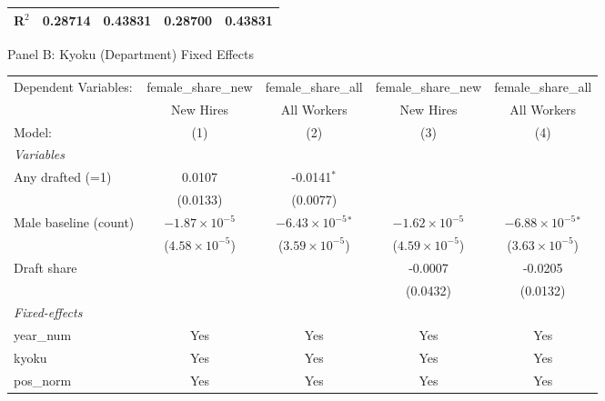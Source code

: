 \begin{table}[htbp]
\begin{threeparttable}
\begin{tabular}{lcccc}
   R$^2$                 & 0.28714                 & 0.43831                 & 0.28700                 & 0.43831\\  
   \midrule \midrule
\end{tabular}
\par\endgroup
\vspace{2ex}
Panel B: Kyoku (Department) Fixed Effects\\[1ex]
\begingroup
\centering
\begin{tabular}{lcccc}
   \tabularnewline \midrule \midrule
   Dependent Variables:  & female\_share\_new      & female\_share\_all           & female\_share\_new      & female\_share\_all\\    
                         & New Hires               & All Workers                  & New Hires               & All Workers \\   
   Model:                & (1)                     & (2)                          & (3)                     & (4)\\  
   \midrule
   \emph{Variables}\\
   Any drafted (=1)      & 0.0107                  & -0.0141$^{*}$                &                         &   \\   
                         & (0.0133)                & (0.0077)                     &                         &   \\   
   Male baseline (count) & $-1.87\times 10^{-5}$   & $-6.43\times 10^{-5}$$^{*}$  & $-1.62\times 10^{-5}$   & $-6.88\times 10^{-5}$$^{*}$\\    
                         & ($4.58\times 10^{-5}$)  & ($3.59\times 10^{-5}$)       & ($4.59\times 10^{-5}$)  & ($3.63\times 10^{-5}$)\\    
   Draft share           &                         &                              & -0.0007                 & -0.0205\\   
                         &                         &                              & (0.0432)                & (0.0132)\\   
   \midrule
   \emph{Fixed-effects}\\
   year\_num             & Yes                     & Yes                          & Yes                     & Yes\\  
   kyoku                 & Yes                     & Yes                          & Yes                     & Yes\\  
   pos\_norm             & Yes                     & Yes                          & Yes                     & Yes\\  

\end{tabular}
\end{threeparttable}
\end{table}
